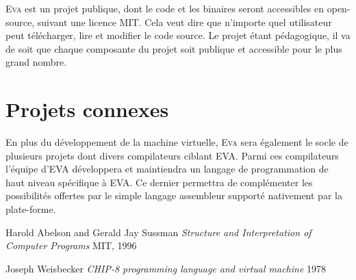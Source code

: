 \documentclass[11pt,twoside,french]{article}
\newcommand{\noun}[1]{\textsc{#1}}
\begin{document}
\noun{Eva} est un projet publique, dont le code et les binaires seront
accessibles en open-source, suivant une licence MIT. Cela veut dire
que n'importe quel utilisateur peut télécharger, lire et modifier
le code source. Le projet étant pédagogique, il va de soit que chaque
composante du projet soit publique et accessible pour le plus grand nombre.

\section{Projets connexes}

En plus du développement de la machine virtuelle, \noun{Eva} sera
également le socle de plusieurs projets dont divers compilateurs ciblant
EVA. Parmi ces compilateurs l'équipe d'EVA développera et maintiendra
un langage de programmation de haut niveau spécifique à EVA. Ce dernier
permettra de complémenter les possibilités offertes par le simple langage
assembleur supporté nativement par la plate-forme.

\newpage{}

\begin{thebibliography}{XXXXXX}
\label{chap:bib}

 Harold Abelson and Gerald Jay Sussman
\emph{Structure and Interpretation of Computer Programs} MIT, 1996

 Joseph Weisbecker
\emph{CHIP-8 programming language and virtual machine} 1978

\end{thebibliography}
\end{document}
